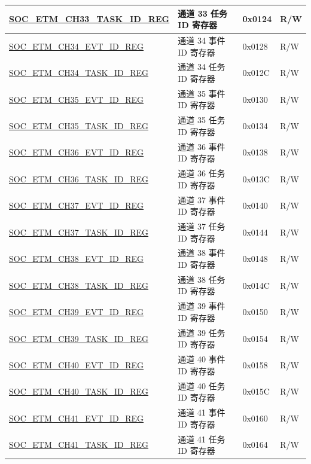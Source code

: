\begin{longtable}{ | p{6cm} | p{6.2cm} | p{1.3cm} | p{2cm} | }
\hyperref[regdesc:SOCETMCHNTASKIDREG]{SOC\_ETM\_CH33\_TASK\_ID\_REG} & 通道 33 任务 ID 寄存器 & 0x0124 & R/W \\ \hline
\hyperref[regdesc:SOCETMCHNEVTIDREG]{SOC\_ETM\_CH34\_EVT\_ID\_REG} & 通道 34 事件 ID 寄存器 & 0x0128 & R/W \\ \hline
\hyperref[regdesc:SOCETMCHNTASKIDREG]{SOC\_ETM\_CH34\_TASK\_ID\_REG} & 通道 34 任务 ID 寄存器 & 0x012C & R/W \\ \hline
\hyperref[regdesc:SOCETMCHNEVTIDREG]{SOC\_ETM\_CH35\_EVT\_ID\_REG} & 通道 35 事件 ID 寄存器 & 0x0130 & R/W \\ \hline
\hyperref[regdesc:SOCETMCHNTASKIDREG]{SOC\_ETM\_CH35\_TASK\_ID\_REG} & 通道 35 任务 ID 寄存器 & 0x0134 & R/W \\ \hline
\hyperref[regdesc:SOCETMCHNEVTIDREG]{SOC\_ETM\_CH36\_EVT\_ID\_REG} & 通道 36 事件 ID 寄存器 & 0x0138 & R/W \\ \hline
\hyperref[regdesc:SOCETMCHNTASKIDREG]{SOC\_ETM\_CH36\_TASK\_ID\_REG} & 通道 36 任务 ID 寄存器 & 0x013C & R/W \\ \hline
\hyperref[regdesc:SOCETMCHNEVTIDREG]{SOC\_ETM\_CH37\_EVT\_ID\_REG} & 通道 37 事件 ID 寄存器 & 0x0140 & R/W \\ \hline
\hyperref[regdesc:SOCETMCHNTASKIDREG]{SOC\_ETM\_CH37\_TASK\_ID\_REG} & 通道 37 任务 ID 寄存器 & 0x0144 & R/W \\ \hline
\hyperref[regdesc:SOCETMCHNEVTIDREG]{SOC\_ETM\_CH38\_EVT\_ID\_REG} & 通道 38 事件 ID 寄存器 & 0x0148 & R/W \\ \hline
\hyperref[regdesc:SOCETMCHNTASKIDREG]{SOC\_ETM\_CH38\_TASK\_ID\_REG} & 通道 38 任务 ID 寄存器 & 0x014C & R/W \\ \hline
\hyperref[regdesc:SOCETMCHNEVTIDREG]{SOC\_ETM\_CH39\_EVT\_ID\_REG} & 通道 39 事件 ID 寄存器 & 0x0150 & R/W \\ \hline
\hyperref[regdesc:SOCETMCHNTASKIDREG]{SOC\_ETM\_CH39\_TASK\_ID\_REG} & 通道 39 任务 ID 寄存器 & 0x0154 & R/W \\ \hline
\hyperref[regdesc:SOCETMCHNEVTIDREG]{SOC\_ETM\_CH40\_EVT\_ID\_REG} & 通道 40 事件 ID 寄存器 & 0x0158 & R/W \\ \hline
\hyperref[regdesc:SOCETMCHNTASKIDREG]{SOC\_ETM\_CH40\_TASK\_ID\_REG} & 通道 40 任务 ID 寄存器 & 0x015C & R/W \\ \hline
\hyperref[regdesc:SOCETMCHNEVTIDREG]{SOC\_ETM\_CH41\_EVT\_ID\_REG} & 通道 41 事件 ID 寄存器 & 0x0160 & R/W \\ \hline
\hyperref[regdesc:SOCETMCHNTASKIDREG]{SOC\_ETM\_CH41\_TASK\_ID\_REG} & 通道 41 任务 ID 寄存器 & 0x0164 & R/W \\ \hline

\end{longtable}
